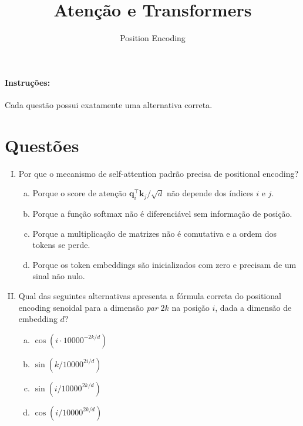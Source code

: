 \documentclass{dlproblemset}
\title{Atenção e Transformers}
\subtitle{Position Encoding}
\begin{document}
\paragraph{Instruções:} Cada questão possui exatamente uma alternativa correta.

\section*{Questões}

\begin{enumerate}[I)]

\item Por que o mecanismo de self-attention padrão precisa de positional encoding?

\begin{enumerate}[a)]
    \item Porque o score de atenção $\mathbf{q}_i^\top \mathbf{k}_j / \sqrt{d}$ não depende
          dos índices $i$ e $j$.
    \item Porque a função softmax não é diferenciável sem informação de posição.
    \item Porque a multiplicação de matrizes não é comutativa e a ordem dos
          tokens se perde.
    \item Porque os token embeddings são inicializados com zero e precisam de um sinal não nulo.
\end{enumerate}

\item Qual das seguintes alternativas apresenta a fórmula correta do positional encoding
      senoidal para a dimensão \emph{par} $2k$ na posição $i$, dada a dimensão de embedding $d$?

\begin{enumerate}[a)]
    \item $\cos\!\left(i \cdot 10000^{-2k/d}\right)$
    \item $\sin\!\left(k / 10000^{2i/d}\right)$
    \item $\sin\!\left(i / 10000^{2k/d}\right)$
    \item $\cos\!\left(i / 10000^{2k/d}\right)$
\end{enumerate}


\end{enumerate}
\end{document}
